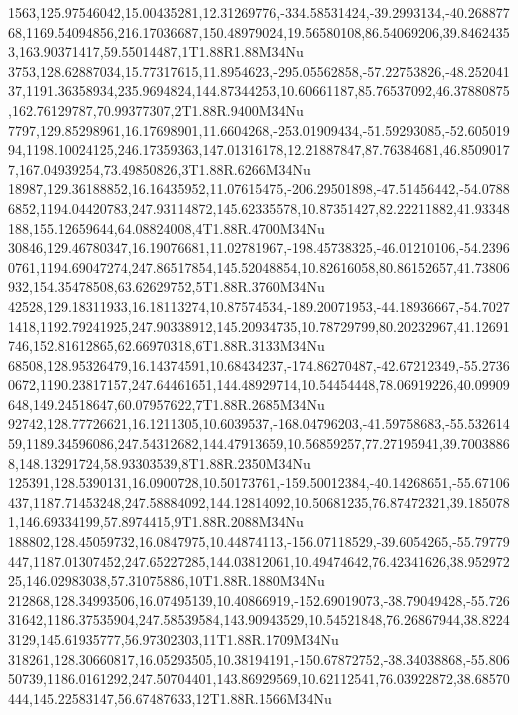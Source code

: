 1563,125.97546042,15.00435281,12.31269776,-334.58531424,-39.2993134,-40.26887768,1169.54094856,216.17036687,150.48979024,19.56580108,86.54069206,39.84624353,163.90371417,59.55014487,1T1.88R1.88M34Nu
3753,128.62887034,15.77317615,11.8954623,-295.05562858,-57.22753826,-48.25204137,1191.36358934,235.9694824,144.87344253,10.60661187,85.76537092,46.37880875,162.76129787,70.99377307,2T1.88R.9400M34Nu
7797,129.85298961,16.17698901,11.6604268,-253.01909434,-51.59293085,-52.60501994,1198.10024125,246.17359363,147.01316178,12.21887847,87.76384681,46.85090177,167.04939254,73.49850826,3T1.88R.6266M34Nu
18987,129.36188852,16.16435952,11.07615475,-206.29501898,-47.51456442,-54.07886852,1194.04420783,247.93114872,145.62335578,10.87351427,82.22211882,41.93348188,155.12659644,64.08824008,4T1.88R.4700M34Nu
30846,129.46780347,16.19076681,11.02781967,-198.45738325,-46.01210106,-54.23960761,1194.69047274,247.86517854,145.52048854,10.82616058,80.86152657,41.73806932,154.35478508,63.62629752,5T1.88R.3760M34Nu
42528,129.18311933,16.18113274,10.87574534,-189.20071953,-44.18936667,-54.70271418,1192.79241925,247.90338912,145.20934735,10.78729799,80.20232967,41.12691746,152.81612865,62.66970318,6T1.88R.3133M34Nu
68508,128.95326479,16.14374591,10.68434237,-174.86270487,-42.67212349,-55.27360672,1190.23817157,247.64461651,144.48929714,10.54454448,78.06919226,40.09909648,149.24518647,60.07957622,7T1.88R.2685M34Nu
92742,128.77726621,16.1211305,10.6039537,-168.04796203,-41.59758683,-55.53261459,1189.34596086,247.54312682,144.47913659,10.56859257,77.27195941,39.70038868,148.13291724,58.93303539,8T1.88R.2350M34Nu
125391,128.5390131,16.0900728,10.50173761,-159.50012384,-40.14268651,-55.67106437,1187.71453248,247.58884092,144.12814092,10.50681235,76.87472321,39.1850781,146.69334199,57.8974415,9T1.88R.2088M34Nu
188802,128.45059732,16.0847975,10.44874113,-156.07118529,-39.6054265,-55.79779447,1187.01307452,247.65227285,144.03812061,10.49474642,76.42341626,38.95297225,146.02983038,57.31075886,10T1.88R.1880M34Nu
212868,128.34993506,16.07495139,10.40866919,-152.69019073,-38.79049428,-55.72631642,1186.37535904,247.58539584,143.90943529,10.54521848,76.26867944,38.82243129,145.61935777,56.97302303,11T1.88R.1709M34Nu
318261,128.30660817,16.05293505,10.38194191,-150.67872752,-38.34038868,-55.80650739,1186.0161292,247.50704401,143.86929569,10.62112541,76.03922872,38.68570444,145.22583147,56.67487633,12T1.88R.1566M34Nu
